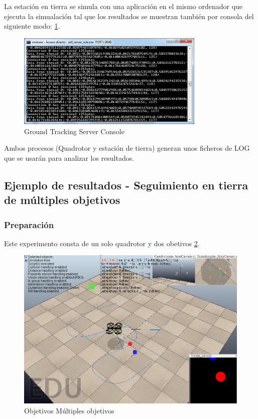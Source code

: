 La estación en tierra se simula con una aplicaci\'on en el mismo ordenador que ejecuta la simualaci\'on tal que los resultados se muestran tambi\'en por consola del siguiente modo: \ref{fig:Ground_Tracking_Server_Console}.

\begin{figure}[ht]
	\centering
	\includegraphics[width=0.8\textwidth,natwidth=677,natheight=342]{../Images/c3/ground_tracking_server_console.png}
	\caption{Ground Tracking Server Console}
	\label{fig:Ground_Tracking_Server_Console}
\end{figure}

Ambos procesos (Quadrotor y estaci\'on de tierra) generan unos ficheros de LOG que se usar\'an para analizar los resultados.

\subsection{Ejemplo de resultados - Seguimiento en tierra de m\'ultiples objetivos}
\subsubsection{Preparaci\'on}
 Este experimento consta de un solo quadrotor y dos obetivos \ref{fig:sim4_set_up}.
 
\begin{figure}[htp]
	\centering
	\includegraphics[width=0.4\linewidth]{../Images/c3/sim4_set_up}
	\caption{Objetivos M\'ultiples objetivos}
	\label{fig:sim4_set_up}
\end{figure}


